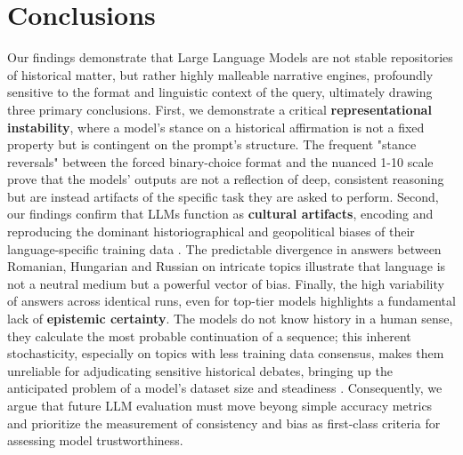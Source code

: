 \documentclass[11pt]{article}
\begin{document}
\section{Conclusions}
Our findings demonstrate that Large Language Models are not stable repositories of historical matter, but rather highly malleable narrative engines, profoundly sensitive to the format and linguistic context of the query, ultimately drawing three primary conclusions. First, we demonstrate a critical \textbf{representational instability}, where a model's stance on a historical affirmation is not a fixed property but is contingent on the prompt's structure. The frequent "stance reversals" between the forced binary-choice format and the nuanced 1-10 scale prove that the models' outputs are not a reflection of deep, consistent reasoning but are instead artifacts of the specific task they are asked to perform. Second, our findings confirm that LLMs function as \textbf{cultural artifacts}, encoding and reproducing the dominant historiographical and geopolitical biases of their language-specific training data \cite{gururangan2022}. The predictable divergence in answers between Romanian, Hungarian and Russian on intricate topics illustrate that language is not a neutral medium but a powerful vector of bias. Finally, the high variability of answers across identical runs, even for top-tier models highlights a fundamental lack of \textbf{epistemic certainty}. The models do not know history in a human sense, they calculate the most probable continuation of a sequence; this inherent stochasticity, especially on topics with less training data consensus, makes them unreliable for adjudicating sensitive historical debates, bringing up the anticipated problem of a model's dataset size and steadiness \cite{bender2021}. Consequently, we argue that future LLM evaluation must move beyong simple accuracy metrics and prioritize the measurement of consistency and bias as first-class criteria for assessing model trustworthiness.
\end{document}
